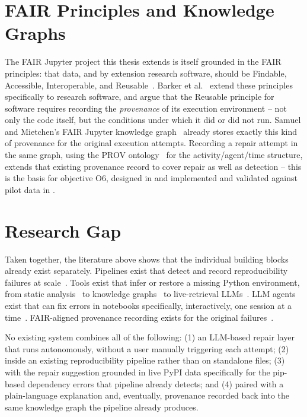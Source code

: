 \section{FAIR Principles and Knowledge Graphs}
\label{sec:rw-fair}

The FAIR Jupyter project this thesis extends is itself grounded in the FAIR
principles: that data, and by extension research software, should be
Findable, Accessible, Interoperable, and Reusable~\cite{wilkinson2016fair}.
Barker et al.~\cite{barker2022fair4rs} extend these principles specifically
to research software, and argue that the Reusable principle for software
requires recording the \emph{provenance} of its execution environment -- not
only the code itself, but the conditions under which it did or did not run.
Samuel and Mietchen's FAIR Jupyter knowledge
graph~\cite{samuel2024fairkg,samuel2024zenodo} already stores exactly this
kind of provenance for the original execution attempts. Recording a repair
attempt in the same graph, using the PROV ontology~\cite{provenance2013} for
the activity/agent/time structure, extends that existing provenance record
to cover repair as well as detection -- this is the basis for objective O6,
designed in  and implemented and validated against
pilot data in .

\section{Research Gap}
\label{sec:rw-gap}

Taken together, the literature above shows that the individual building
blocks already exist separately. Pipelines exist that detect and record
reproducibility failures at
scale~\cite{samuel2025docker,samuel2024gigascience,samuel2024fairkg}. Tools
exist that infer or restore a missing Python
environment, from static analysis~\cite{wang2021snifferdog} to
knowledge graphs~\cite{horton2019dockerizeme,ye2022pyego,cheng2022pycre,cheng2024readpye}
to live-retrieval LLMs~\cite{bartlett2025pllm}. LLM agents exist that can fix
errors in notebooks specifically, interactively, one session at a
time~\cite{grotov2024untangling,grotov2024debug}. FAIR-aligned provenance
recording exists for the original failures~\cite{samuel2024fairkg}.

No existing system combines all of the following: (1) an LLM-based repair
layer that runs autonomously, without a user manually triggering each
attempt; (2) inside an existing reproducibility pipeline rather than on
standalone files; (3) with the repair suggestion grounded in live PyPI data
specifically for the pip-based dependency errors that pipeline already
detects; and (4) paired with a plain-language explanation and, eventually,
provenance recorded back into the same knowledge graph the pipeline already
produces.

